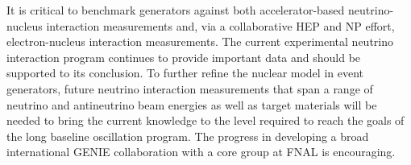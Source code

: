 It is critical to benchmark generators against both
accelerator-based neutrino-nucleus interaction measurements and, via a
collaborative HEP and NP effort, electron-nucleus interaction
measurements.
The current experimental neutrino interaction program %
continues to provide important data and should be supported to its
conclusion.  To further refine the nuclear model in event generators,
future neutrino interaction measurements that span a range of neutrino
and antineutrino beam energies as well as target materials will be
needed to bring the current knowledge to the level required to reach
the goals of the long baseline oscillation program. The progress in
developing a broad international GENIE collaboration with a core group
at FNAL is encouraging.



